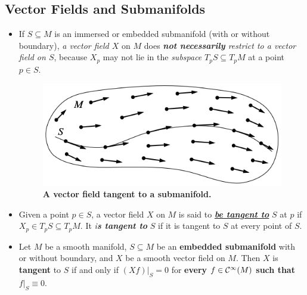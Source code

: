 \documentclass[11pt]{article}
\begin{document}
\subsection{Vector Fields and Submanifolds}
\begin{itemize}
\item \begin{remark}
If $S \subseteq M$ is an immersed or embedded submanifold (with or without boundary), \emph{a vector field $X$} on $M$ does \emph{\textbf{not necessarily} restrict to a vector field on $S$}, because $X_p$ may not lie in the \emph{subspace} $T_{p}S \subseteq T_{p}M$ at a point $p \in S$.
\end{remark}

\begin{figure}
\begin{minipage}[htb]{1\linewidth}
  \centering
  \centerline{\includegraphics[scale = 0.5]{vector_field_tangent_subman.png}}
\end{minipage}
\caption{\footnotesize{\textbf{A vector field tangent to a submanifold. \citep{lee2003introduction}}}}
\label{fig: vector_field_tangent_subman}
\end{figure}


\item \begin{definition}
Given a point $p \in S$, a vector field $X$ on $M$ is said to \underline{\emph{\textbf{be tangent to}}} $S$ at $p$ if $X_p \in T_{p}S \subseteq T_{p}M$. It \emph{i\textbf{s tangent to}} $S$ if it is tangent to $S$ at every point of $S$.
\end{definition}

\item \begin{proposition}
Let $M$ be a smooth manifold, $S\subseteq M$ be an \textbf{embedded submanifold} with or without boundary, and $X$ be a smooth vector field on $M$. Then $X$ is
\textbf{tangent} to $S$ if and only if $(Xf)|_{S} = 0$ for \textbf{every} \underline{$f \in {\mathcal C}^{\infty}(M)$}  \textbf{such that} \underline{$f|_{S}\equiv 0$}.
\end{proposition}


\end{itemize}
\end{document}

